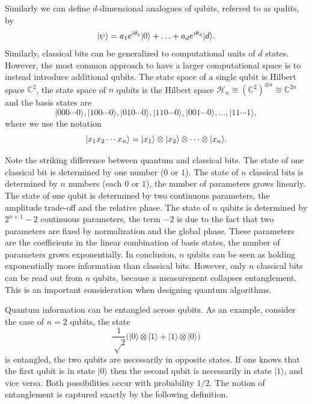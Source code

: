 Similarly we can define $d$-dimensional analogues of qubits, referred to as qudits, by
\begin{equation}
  \lvert\psi\rangle = a_1 e^{i\theta_1} \lvert0\rangle + \ldots + a_d e^{i \theta_d} \lvert d\rangle.
\end{equation}
Similarly, classical bits can be generalized to computational units of $d$ states. However, the most common approach to have a larger computational space is to instead introduce additional qubits. The state space of a single qubit is Hilbert space $\mathbb{C}^2$, the state space of $n$ qubits is the Hilbert space $\mathcal{H}_n \cong (\mathbb{C}^2)^{\otimes n} \cong \mathbb{C}^{2n}$ and the basis states are
\begin{equation}
  |000⋯0⟩, |100⋯0⟩, |010⋯0⟩, |110⋯0⟩, |001⋯0⟩, …, |11⋯1⟩,
\end{equation}
where we use the notation
\begin{equation}
  \lvert x_1x_2\cdots x_n\rangle = \lvert x_1\rangle\otimes\lvert x_2\rangle\otimes\cdots\otimes\lvert x_n\rangle.
\end{equation}

Note the striking difference between quantum and classical bits. The state of one classical bit is determined by one number ($0$ or $1$). The state of $n$ classical bits is determined by $n$ numbers (each $0$ or $1$), the number of parameters grows linearly. The state of one qubit is determined by two continuous parameters, the amplitude trade-off and the relative phase. The state of $n$ qubits is determined by $2^{n+1}-2$ continuous parameters, the term $-2$ is due to the fact that two parameters are fixed by normalization and the global phase. These parameters are the coefficients in the linear combination of basis states, the number of parameters grows exponentially. In conclusion, $n$ qubits can be seen as holding exponentially more information than classical bits. However, only $n$ classical bits can be read out from $n$ qubits, because a measurement collapses entanglement. This is an important consideration when designing quantum algorithms.

Quantum information can be entangled across qubits. As an example, consider the case of $n = 2$ qubits, the state
\begin{equation}
  \frac{1}{√2}\big(|0⟩⊗|1⟩ + |1⟩⊗|0⟩\big)
\end{equation}
is entangled, the two qubits are necessarily in opposite states. If one knows that the first qubit is in state $|0⟩$ then the second qubit is necessarily in state $|1⟩$, and vice versa. Both possibilities occur with probability $1/2$. The notion of entanglement is captured exactly by the following definition.

